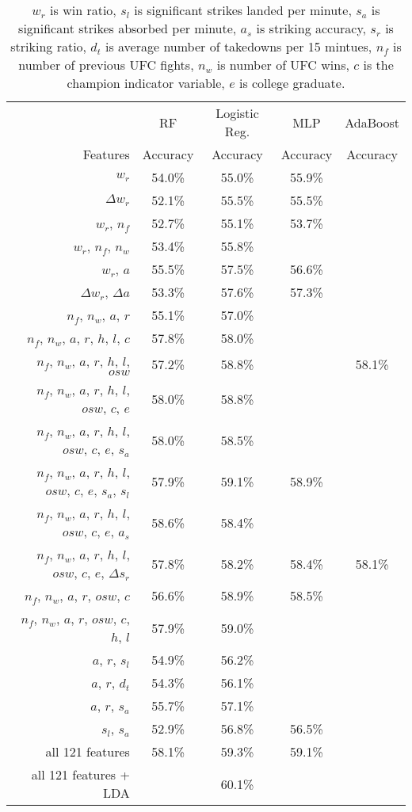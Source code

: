 \begin{center}
\begin{table}[h]
\begin{tabular}{r|cccc}
\toprule
         & RF       & Logistic Reg. & MLP      & AdaBoost\\
Features & Accuracy & Accuracy      & Accuracy & Accuracy\\
\hline
$w_r$ & 54.0\% & 55.0\% & 55.9\% & \\
$\Delta w_r$ & 52.1\% & 55.5\% & 55.5\% & \\
$w_r$, $n_f$ & 52.7\% & 55.1\% & 53.7\% & \\
$w_r$, $n_f$, $n_w$ & 53.4\% & 55.8\% &  & \\
$w_r$, $a$ & 55.5\% & 57.5\% & 56.6\% & \\
$\Delta w_r$, $\Delta a$ & 53.3\% & 57.6\% & 57.3\% & \\
$n_f$, $n_w$, $a$, $r$ & 55.1\% & 57.0\% \\
$n_f$, $n_w$, $a$, $r$, $h$, $l$, $c$ & 57.8\% & 58.0\% & &\\
$n_f$, $n_w$, $a$, $r$, $h$, $l$, $osw$ & 57.2\% & 58.8\% & & 58.1\%\\
$n_f$, $n_w$, $a$, $r$, $h$, $l$, $osw$, $c$, $e$ & 58.0\% & 58.8\% & &\\
$n_f$, $n_w$, $a$, $r$, $h$, $l$, $osw$, $c$, $e$, $s_a$ & 58.0\% & 58.5\% & & \\
$n_f$, $n_w$, $a$, $r$, $h$, $l$, $osw$, $c$, $e$, $s_a$, $s_l$ & 57.9\% &59.1\% &58.9\% & \\
$n_f$, $n_w$, $a$, $r$, $h$, $l$, $osw$, $c$, $e$, $a_s$ & 58.6\% & 58.4\% \\
$n_f$, $n_w$, $a$, $r$, $h$, $l$, $osw$, $c$, $e$, $\Delta s_r$ & 57.8\% & 58.2\% & 58.4\% & 58.1\%\\
$n_f$, $n_w$, $a$, $r$, $osw$, $c$ & 56.6\% & 58.9\% & 58.5\% \\
$n_f$, $n_w$, $a$, $r$, $osw$, $c$, $h$, $l$ & 57.9\% & 59.0\% & &\\
$a$, $r$, $s_l$ & 54.9\% & 56.2\% & & \\
$a$, $r$, $d_t$ & 54.3\% & 56.1\% & & \\
$a$, $r$, $s_a$ & 55.7\% & 57.1\% & & \\
$s_l$, $s_a$ & 52.9\% & 56.8\% & 56.5\% & \\
all 121 features & 58.1\% & 59.3\% & 59.1\% & \\
all 121 features + LDA &  & 60.1\% & & \\
\bottomrule
\end{tabular}
\caption{$w_r$ is win ratio, $s_l$ is significant strikes landed per minute,
$s_a$ is significant strikes absorbed per minute, $a_s$ is striking accuracy,
$s_r$ is striking ratio, $d_t$ is average number of takedowns per 15 mintues,
$n_f$ is number of previous UFC fights, $n_w$ is number
of UFC wins, $c$ is the champion indicator variable, $e$ is college graduate.}
\label{other_features}
\end{table}
\end{center}

